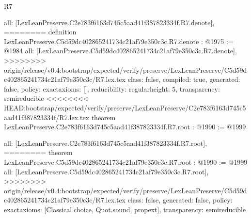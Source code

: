 \begin{lexlean}{R7}
\begin{coremodule}
{{{{{{{{{{{{  all: [LexLeanPreserve.C2e783f6163d745c5aad41f387823334f.R7.denote],
========
definition LexLeanPreserve.C5d59dc402865241734c21af79e350c3c.R7.denote : @1975 := @1984 {
  all: [LexLeanPreserve.C5d59dc402865241734c21af79e350c3c.R7.denote],
>>>>>>>> origin/release/v0.4:bootstrap/expected/verify/preserve/LexLeanPreserve/C5d59dc402865241734c21af79e350c3c/R7.lex.tex
  class: false,
  compiled: true,
  generated: false,
  policy: exact{axioms: []},
  reducibility: regular{height: 5},
  transparency: semireducible
}
<<<<<<<< HEAD:bootstrap/expected/verify/preserve/LexLeanPreserve/C2e783f6163d745c5aad41f387823334f/R7.lex.tex
theorem LexLeanPreserve.C2e783f6163d745c5aad41f387823334f.R7.root : @1990 := @1999 {
  all: [LexLeanPreserve.C2e783f6163d745c5aad41f387823334f.R7.root],
========
theorem LexLeanPreserve.C5d59dc402865241734c21af79e350c3c.R7.root : @1990 := @1999 {
  all: [LexLeanPreserve.C5d59dc402865241734c21af79e350c3c.R7.root],
>>>>>>>> origin/release/v0.4:bootstrap/expected/verify/preserve/LexLeanPreserve/C5d59dc402865241734c21af79e350c3c/R7.lex.tex
  class: false,
  generated: false,
  policy: exact{axioms: [Classical.choice, Quot.sound, propext]},
  transparency: semireducible
}

}}}}}}}}}}}}}
\end{coremodule}
\end{lexlean}
